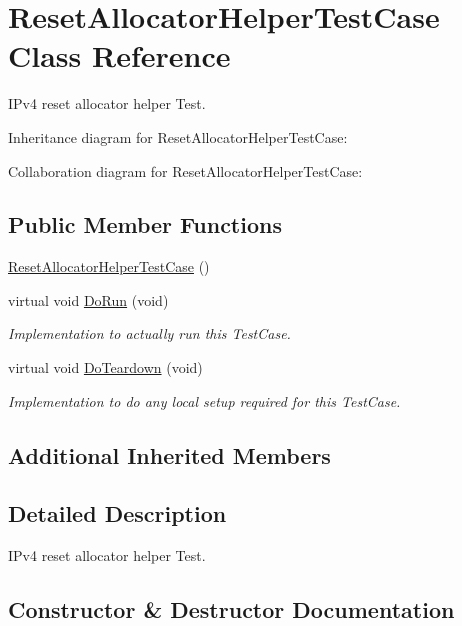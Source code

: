 \hypertarget{classResetAllocatorHelperTestCase}{}\section{Reset\+Allocator\+Helper\+Test\+Case Class Reference}
\label{classResetAllocatorHelperTestCase}


I\+Pv4 reset allocator helper Test.  




Inheritance diagram for Reset\+Allocator\+Helper\+Test\+Case\+:


Collaboration diagram for Reset\+Allocator\+Helper\+Test\+Case\+:
\subsection*{Public Member Functions}
\begin{DoxyCompactItemize}
\item 
\hyperlink{classResetAllocatorHelperTestCase_aa2edc687749e66bef4836fa5723bf0d0}{Reset\+Allocator\+Helper\+Test\+Case} ()
\item 
virtual void \hyperlink{classResetAllocatorHelperTestCase_a9bee6193e81b37cbc0e504a63fb618da}{Do\+Run} (void)
\begin{DoxyCompactList}\small\item\em Implementation to actually run this Test\+Case. \end{DoxyCompactList}\item 
virtual void \hyperlink{classResetAllocatorHelperTestCase_ab079504ad193514f345db867c2425ce2}{Do\+Teardown} (void)
\begin{DoxyCompactList}\small\item\em Implementation to do any local setup required for this Test\+Case. \end{DoxyCompactList}\end{DoxyCompactItemize}
\subsection*{Additional Inherited Members}


\subsection{Detailed Description}
I\+Pv4 reset allocator helper Test. 

\subsection{Constructor \& Destructor Documentation}
